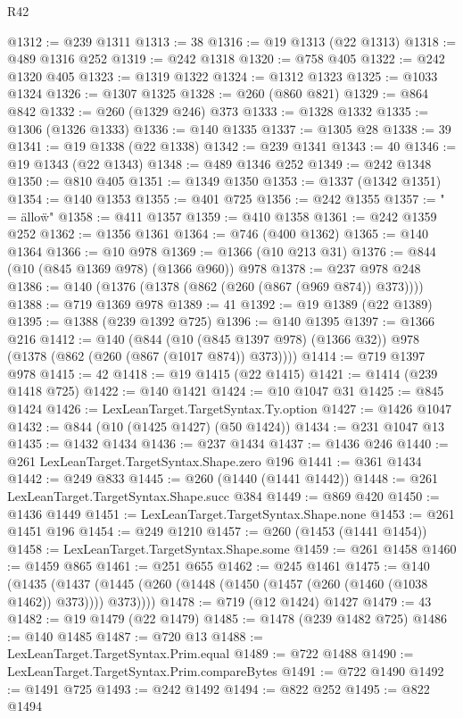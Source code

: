 \begin{lexlean}{R42}
\begin{coremodule}
@1312 := @239 @1311
@1313 := 38
@1316 := @19 @1313 (@22 @1313)
@1318 := @489 @1316 @252
@1319 := @242 @1318
@1320 := @758 @405
@1322 := @242 @1320 @405
@1323 := @1319 @1322
@1324 := @1312 @1323
@1325 := @1033 @1324
@1326 := @1307 @1325
@1328 := @260 (@860 @821)
@1329 := @864 @842
@1332 := @260 (@1329 @246) @373
@1333 := @1328 @1332
@1335 := @1306 (@1326 @1333)
@1336 := @140 @1335
@1337 := @1305 @28
@1338 := 39
@1341 := @19 @1338 (@22 @1338)
@1342 := @239 @1341
@1343 := 40
@1346 := @19 @1343 (@22 @1343)
@1348 := @489 @1346 @252
@1349 := @242 @1348
@1350 := @810 @405
@1351 := @1349 @1350
@1353 := @1337 (@1342 @1351)
@1354 := @140 @1353
@1355 := @401 @725
@1356 := @242 @1355
@1357 := " = \"allow\"\n"
@1358 := @411 @1357
@1359 := @410 @1358
@1361 := @242 @1359 @252
@1362 := @1356 @1361
@1364 := @746 (@400 @1362)
@1365 := @140 @1364
@1366 := @10 @978
@1369 := @1366 (@10 @213 @31)
@1376 := @844 (@10 (@845 @1369 @978) (@1366 @960)) @978
@1378 := @237 @978 @248
@1386 := @140 (@1376 (@1378 (@862 (@260 (@867 (@969 @874)) @373))))
@1388 := @719 @1369 @978
@1389 := 41
@1392 := @19 @1389 (@22 @1389)
@1395 := @1388 (@239 @1392 @725)
@1396 := @140 @1395
@1397 := @1366 @216
@1412 := @140
    (@844 (@10 (@845 @1397 @978) (@1366 @32)) @978 (@1378 (@862 (@260 (@867 (@1017 @874)) @373))))
@1414 := @719 @1397 @978
@1415 := 42
@1418 := @19 @1415 (@22 @1415)
@1421 := @1414 (@239 @1418 @725)
@1422 := @140 @1421
@1424 := @10 @1047 @31
@1425 := @845 @1424
@1426 := LexLeanTarget.TargetSyntax.Ty.option
@1427 := @1426 @1047
@1432 := @844 (@10 (@1425 @1427) (@50 @1424))
@1434 := @231 @1047 @13
@1435 := @1432 @1434
@1436 := @237 @1434
@1437 := @1436 @246
@1440 := @261 LexLeanTarget.TargetSyntax.Shape.zero @196
@1441 := @361 @1434
@1442 := @249 @833
@1445 := @260 (@1440 (@1441 @1442))
@1448 := @261 LexLeanTarget.TargetSyntax.Shape.succ @384
@1449 := @869 @420
@1450 := @1436 @1449
@1451 := LexLeanTarget.TargetSyntax.Shape.none
@1453 := @261 @1451 @196
@1454 := @249 @1210
@1457 := @260 (@1453 (@1441 @1454))
@1458 := LexLeanTarget.TargetSyntax.Shape.some
@1459 := @261 @1458
@1460 := @1459 @865
@1461 := @251 @655
@1462 := @245 @1461
@1475 := @140
    (@1435 (@1437 (@1445 (@260 (@1448 (@1450 (@1457 (@260 (@1460 (@1038 @1462)) @373)))) @373))))
@1478 := @719 (@12 @1424) @1427
@1479 := 43
@1482 := @19 @1479 (@22 @1479)
@1485 := @1478 (@239 @1482 @725)
@1486 := @140 @1485
@1487 := @720 @13
@1488 := LexLeanTarget.TargetSyntax.Prim.equal
@1489 := @722 @1488
@1490 := LexLeanTarget.TargetSyntax.Prim.compareBytes
@1491 := @722 @1490
@1492 := @1491 @725
@1493 := @242 @1492
@1494 := @822 @252
@1495 := @822 @1494

\end{coremodule}
\end{lexlean}
